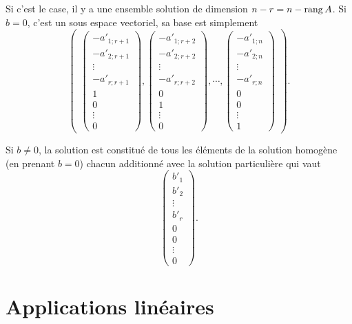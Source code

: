 Si c'est le case, il y a une ensemble solution de
dimension $n - r = n - \operatorname{rang} A$.
Si $b = 0$, c'est un sous espace vectoriel, sa base est simplement
\[ \begin{pmatrix}
    \begin{pmatrix}
      -a'_{1;r+1}\\
      -a'_{2;r+1}\\
      \vdots\\
      -a'_{r;r+1}\\
      1\\
      0\\
      \vdots\\
      0
    \end{pmatrix},
    \begin{pmatrix}
      -a'_{1;r+2}\\
      -a'_{2;r+2}\\
      \vdots\\
      -a'_{r;r+2}\\
      0\\
      1\\
      \vdots\\
      0
    \end{pmatrix},
    \cdots,
    \begin{pmatrix}
      -a'_{1;n}\\
      -a'_{2;n}\\
      \vdots\\
      -a'_{r;n}\\
      0\\
      0\\
      \vdots\\
      1
    \end{pmatrix}
\end{pmatrix}. \]

Si $b \neq 0$, la solution est constitué de tous les éléments de
la solution homogène (en prenant $b = 0$) chacun additionné avec la solution
particulière qui vaut
\[
  \begin{pmatrix}
    b'_1\\
    b'_2\\
    \vdots\\
    b'_r\\
    0\\
    0\\
    \vdots\\
    0
  \end{pmatrix}.
\]

\section{Applications linéaires}

